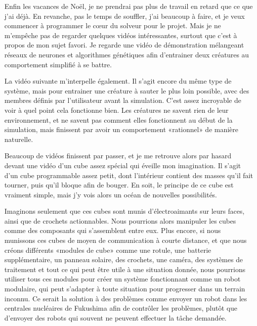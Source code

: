 \documentclass[12pt,final]{report} %
\begin{document}
{

Enfin les vacances de Noël, je ne prendrai pas plus de travail en retard que ce que j'ai déjà. 
En revanche, pas le temps de souffler, j'ai beaucoup à faire, et je veux commencer à programmer le c\oe{}ur du solveur pour le projet.
Mais je ne m'empêche pas de regarder quelques vidéos intéressantes, surtout que c'est à propos de mon sujet favori.
Je regarde une vidéo de démonstration mélangeant réseaux de neurones et algorithmes génétiques afin d'entrainer deux créatures au comportement simplifié à se battre.

La vidéo suivante m'interpelle également.
Il s'agit encore du même type de système, mais pour entrainer une créature à sauter le plus loin possible, avec des membres définis par l'utilisateur avant la simulation.
C'est assez incroyable de voir à quel point cela fonctionne bien.
Les créatures ne savent rien de leur environnement, et ne savent pas comment elles fonctionnent au début de la simulation, mais finissent par avoir un comportement «rationnel» de manière naturelle.


Beaucoup de vidéos finissent par passer, et je me retrouve alors par hasard devant une vidéo d'un cube assez spécial qui éveille mon imagination. 
Il s'agit d'un cube programmable assez petit, dont l'intérieur contient des masses qu'il fait tourner, puis qu'il bloque afin de bouger.%
En soit, le principe de ce cube est vraiment simple, mais j'y vois alors un océan de nouvelles possibilités.

Imaginons seulement que ces cubes sont munis d'électroaimants sur leurs faces, ainsi que de crochets actionnables. 
Nous pourrions alors manipuler les cubes comme des composants qui s'assemblent entre eux.
Plus encore, si nous munissons ces cubes de moyen de communication à courte distance, et que nous créons différents «modules de cube» comme une rotule, une batterie supplémentaire, un panneau solaire, des crochets, une caméra, des systèmes de traitement et tout ce qui peut être utile à une situation donnée, nous pourrions utiliser tous ces modules pour créer un système fonctionnant comme un robot modulaire, qui peut s'adapter à toute situation pour progresser dans un terrain inconnu.
Ce serait la solution à des problèmes comme envoyer un robot dans les centrales nucléaires de Fukushima afin de contrôler les problèmes, plutôt que d'envoyer des robots qui souvent ne peuvent effectuer la tâche demandée.

}
\end{document}
